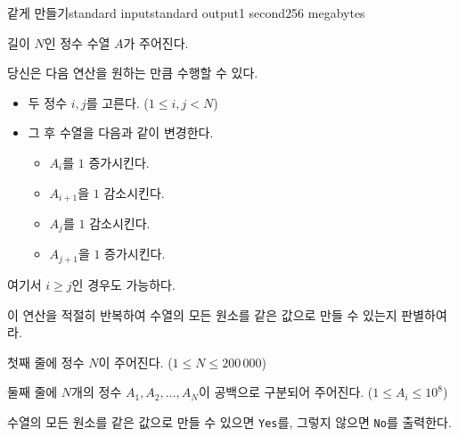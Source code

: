 \begin{problem}{같게 만들기}{standard input}{standard output}{1 second}{256 megabytes}

길이 $N$인 정수 수열 $A$가 주어진다.

당신은 다음 연산을 원하는 만큼 수행할 수 있다.

\begin{itemize}
    \item 두 정수 $i, j$를 고른다. ($1 \le i, j < N$)
    \item 그 후 수열을 다음과 같이 변경한다.
    \begin{itemize}
        \item $A_i$를 $1$ 증가시킨다.
        \item $A_{i+1}$을 $1$ 감소시킨다.
        \item $A_j$를 $1$ 감소시킨다.
        \item $A_{j+1}$을 $1$ 증가시킨다.
    \end{itemize}
\end{itemize}

여기서 $i \ge j$인 경우도 가능하다.

이 연산을 적절히 반복하여 수열의 모든 원소를 같은 값으로 만들 수 있는지 판별하여라.

\InputFile
첫째 줄에 정수 $N$이 주어진다. ($1 \le N \le 200\,000$)

둘째 줄에 $N$개의 정수 $A_1, A_2, \ldots, A_N$이 공백으로 구분되어 주어진다. ($1 \le A_i \le 10^8$)

\OutputFile
수열의 모든 원소를 같은 값으로 만들 수 있으면 \texttt{Yes}를, 그렇지 않으면 \texttt{No}를 출력한다.

\Examples

\begin{example}
%
%
\end{example}

\end{problem}

